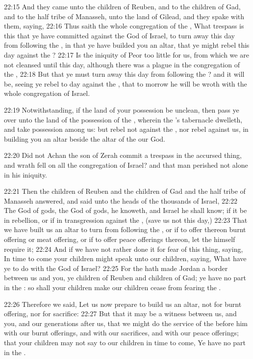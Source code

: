 22:15 And they came unto the children of Reuben, and to the children
of Gad, and to the half tribe of Manasseh, unto the land of Gilead,
and they spake with them, saying, 22:16 Thus saith the whole
congregation of the \LORD, What trespass is this that ye have committed
against the God of Israel, to turn away this day from following the
\LORD, in that ye have builded you an altar, that ye might rebel this
day against the \LORD?  22:17 Is the iniquity of Peor too little for
us, from which we are not cleansed until this day, although there was
a plague in the congregation of the \LORD, 22:18 But that ye must turn
away this day from following the \LORD? and it will be, seeing ye rebel
to day against the \LORD, that to morrow he will be wroth with the
whole congregation of Israel.

22:19 Notwithstanding, if the land of your possession be unclean, then
pass ye over unto the land of the possession of the \LORD, wherein the
\LORD's tabernacle dwelleth, and take possession among us: but rebel
not against the \LORD, nor rebel against us, in building you an altar
beside the altar of the \LORD our God.

22:20 Did not Achan the son of Zerah commit a trespass in the accursed
thing, and wrath fell on all the congregation of Israel? and that man
perished not alone in his iniquity.

22:21 Then the children of Reuben and the children of Gad and the half
tribe of Manasseh answered, and said unto the heads of the thousands
of Israel, 22:22 The \LORD God of gods, the \LORD God of gods, he
knoweth, and Israel he shall know; if it be in rebellion, or if in
transgression against the \LORD, (save us not this day,) 22:23 That we
have built us an altar to turn from following the \LORD, or if to offer
thereon burnt offering or meat offering, or if to offer peace
offerings thereon, let the \LORD himself require it; 22:24 And if we
have not rather done it for fear of this thing, saying, In time to
come your children might speak unto our children, saying, What have ye
to do with the \LORD God of Israel?  22:25 For the \LORD hath made
Jordan a border between us and you, ye children of Reuben and children
of Gad; ye have no part in the \LORD: so shall your children make our
children cease from fearing the \LORD.

22:26 Therefore we said, Let us now prepare to build us an altar, not
for burnt offering, nor for sacrifice: 22:27 But that it may be a
witness between us, and you, and our generations after us, that we
might do the service of the \LORD before him with our burnt offerings,
and with our sacrifices, and with our peace offerings; that your
children may not say to our children in time to come, Ye have no part
in the \LORD.

